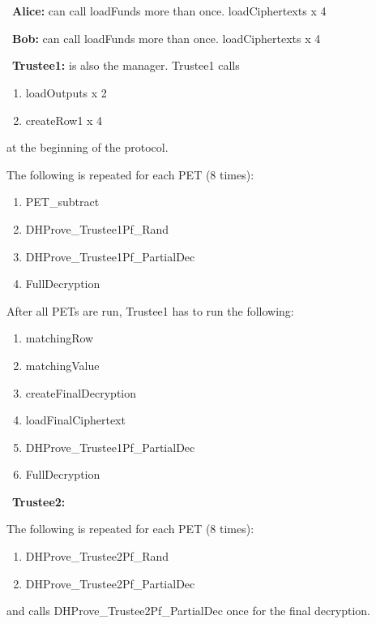 \section{}

~\textbf{Alice:} can call loadFunds more than once. loadCiphertexts  x 4

~\textbf{Bob:} can call loadFunds more than once. loadCiphertexts x 4

~\textbf{Trustee1:} is also the manager. Trustee1 calls  
\begin{enumerate}
	\item loadOutputs  x 2
	\item  createRow1  x 4
\end{enumerate}
at the beginning of the protocol. 
\newline

The following is repeated for each PET (8 times): 
\begin{enumerate}
	\item PET\_subtract
	\item DHProve\_Trustee1Pf\_Rand
	\item DHProve\_Trustee1Pf\_PartialDec
	 \item FullDecryption
\end{enumerate}

After all PETs are run, Trustee1 has to run the following:
\begin{enumerate}
	\item matchingRow
	\item matchingValue
	\item createFinalDecryption
	\item loadFinalCiphertext
	\item DHProve\_Trustee1Pf\_PartialDec
	\item FullDecryption
\end{enumerate}

~\textbf{Trustee2:} 

The following is repeated for each PET (8 times): 
\begin{enumerate}
	\item DHProve\_Trustee2Pf\_Rand 
	\item DHProve\_Trustee2Pf\_PartialDec
\end{enumerate}
and calls DHProve\_Trustee2Pf\_PartialDec once for the final decryption.


